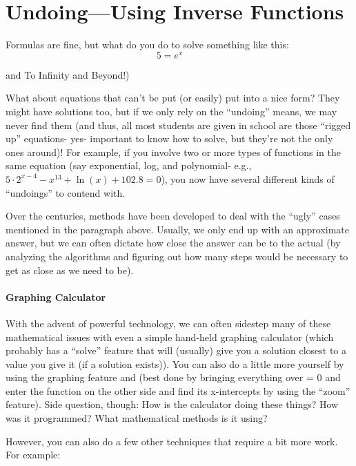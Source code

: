 \newpage
\section{Undoing---Using Inverse Functions}



\begin{prob}
Formulas are fine, but what do you do to solve something like this:
\[
5 = e^x \qquad \text{}
\]
\end{prob}





and To Infinity and Beyond!)

What about equations that can't be put (or easily) put into a nice
form?  They might have solutions too, but if we only rely on the
``undoing'' means, we may never find them (and thus, all most students
are given in school are those ``rigged up'' equations- yes- important
to know how to solve, but they're not the only ones around)!  For
example, if you involve two or more types of functions in the same
equation (say exponential, log, and polynomial- e.g., $5\cdot
2^{x-4}-x^13 + \ln(x) + 102.8=0$), you now have several different
kinds of ``undoings'' to contend with.

Over the centuries, methods have been developed to deal with the
``ugly'' cases mentioned in the paragraph above.  Usually, we only end
up with an approximate answer, but we can often dictate how close the
answer can be to the actual (by analyzing the algorithms and figuring
out how many steps would be necessary to get as close as we need to
be).

\paragraph{Graphing Calculator} 
With the advent of powerful technology, we can often sidestep many of
these mathematical issues with even a simple hand-held graphing
calculator (which probably has a ``solve'' feature that will (usually)
give you a solution closest to a value you give it (if a solution
exists)).  You can also do a little more yourself by using the
graphing feature and (best done by bringing everything over = 0 and
enter the function on the other side and find its x-intercepts by
using the ``zoom'' feature).  Side question, though: How is the
calculator doing these things?  How was it programmed?  What
mathematical methods is it using?

However, you can also do a few other techniques that require a bit
more work.  For example:

